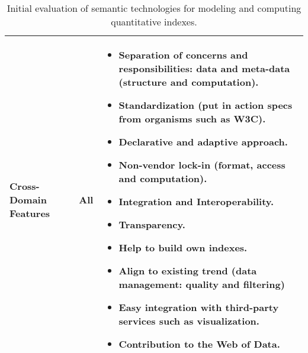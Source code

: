 \begin{table}[!htb]
\begin{center}
\begin{tabular}{|p{3cm}|p{3cm}|p{6.5cm}|}
                 Cross-Domain Features & All & \begin{itemize}
                  \item Separation of concerns and responsibilities: data and meta-data (structure and computation).
                  \item Standardization (put in action specs from organisms such as W3C).
                  \item Declarative and adaptive approach.
                  \item Non-vendor lock-in (format, access and computation).
                  \item Integration and Interoperability.
                  \item Transparency.
                  \item Help to build own indexes.
                  \item Align to existing trend (data management: quality and filtering)
                  \item Easy integration with third-party services such as visualization.
                  \item Contribution to the Web of Data.
                 \end{itemize} \\ \hline        
       
  \hline
  \end{tabular}
  \caption{Initial evaluation of semantic technologies for modeling and computing quantitative indexes.}
  \label{tab:eval-rdfindex}
  \end{center}
\end{table} 



%          


 